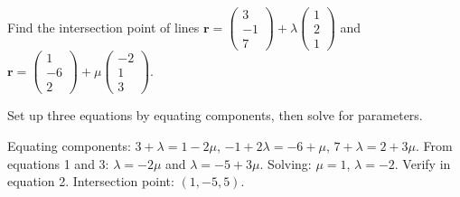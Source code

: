 \begin{problem}
Find the intersection point of lines $\mathbf{r} = \begin{pmatrix} 3 \\ -1 \\ 7 \end{pmatrix} + \lambda \begin{pmatrix} 1 \\ 2 \\ 1 \end{pmatrix}$ and $\mathbf{r} = \begin{pmatrix} 1 \\ -6 \\ 2 \end{pmatrix} + \mu \begin{pmatrix} -2 \\ 1 \\ 3 \end{pmatrix}$.
\end{problem}

\begin{hint}
Set up three equations by equating components, then solve for parameters.
\end{hint}

\begin{solution}[Sketch]
Equating components: $3 + \lambda = 1 - 2\mu$, $-1 + 2\lambda = -6 + \mu$, $7 + \lambda = 2 + 3\mu$. From equations 1 and 3: $\lambda = -2\mu$ and $\lambda = -5 + 3\mu$. Solving: $\mu = 1$, $\lambda = -2$. Verify in equation 2. Intersection point: $(1, -5, 5)$.
\end{solution}

